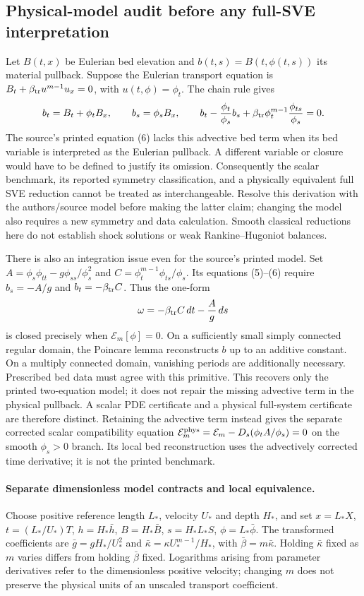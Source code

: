 \documentclass[11pt]{article}
\theoremstyle{definition}
\newcommand{\E}{\mathcal E}
\begin{document}
\subsection{Physical-model audit before any full-SVE interpretation}
Let $B(t,x)$ be Eulerian bed elevation and $b(t,s)=B(t,\phi(t,s))$ its
material pullback. Suppose the Eulerian transport equation is
$B_t+\beta_{\rm tr}u^{m-1}u_x=0$, with $u(t,\phi)=\phi_t$.
The chain rule gives
\begin{equation}
 b_t=B_t+\phi_tB_x,\qquad b_s=\phi_sB_x,
 \qquad
 b_t-\frac{\phi_t}{\phi_s}b_s
       +\beta_{\rm tr}\phi_t^{m-1}\frac{\phi_{ts}}{\phi_s}=0.
 \label{eq:physical-bed-audit}
\end{equation}
The source's printed equation (6) lacks this advective bed term when its bed
variable is interpreted as the Eulerian pullback. A different variable or
closure would have to be defined to justify its omission. Consequently the
scalar benchmark, its reported symmetry classification, and a physically
equivalent full SVE reduction cannot be treated as interchangeable. Resolve
this derivation with the authors/source model before making the latter claim;
changing the model also requires a new symmetry and data calculation.
Smooth classical reductions here do not establish shock solutions or weak
Rankine--Hugoniot balances.

There is also an integration issue even for the source's printed model.
Set $A=\phi_s\phi_{tt}-g\phi_{ss}/\phi_s^2$ and
$C=\phi_t^{m-1}\phi_{ts}/\phi_s$. Its equations (5)--(6) require
$b_s=-A/g$ and $b_t=-\beta_{\rm tr}C$. Thus the one-form
\[
 \omega=-\beta_{\rm tr}C\,dt-\frac{A}{g}\,ds
\]
is closed precisely when $\mathcal E_m[\phi]=0$. On a sufficiently small
simply connected regular domain, the Poincare lemma reconstructs $b$ up to
an additive constant. On a multiply connected domain, vanishing periods
are additionally necessary. Prescribed bed data must agree with this
primitive. This recovers only the printed two-equation model; it does not
repair the missing advective term in the physical pullback. A scalar PDE
certificate and a physical full-system certificate are therefore distinct.
Retaining the advective term instead gives the separate corrected scalar
compatibility equation
$\E_m^{\rm phys}=\E_m-D_s(\phi_tA/\phi_s)=0$
on the smooth $\phi_s>0$ branch. Its local bed reconstruction uses the
advectively corrected time derivative; it is not the printed benchmark.

\paragraph{Separate dimensionless model contracts and local equivalence.}
Choose positive reference length $L_*$, velocity $U_*$ and depth $H_*$,
and set $x=L_*X$, $t=(L_*/U_*)T$, $h=H_*\bar h$,
$B=H_*\bar B$, $s=H_*L_*S$, $\phi=L_*\bar\phi$.
The transformed coefficients are $\bar g=gH_*/U_*^2$ and
$\bar\kappa=\kappa U_*^{m-1}/H_*$, with $\bar\beta=m\bar\kappa$.
Holding $\bar\kappa$ fixed as $m$ varies differs from holding
$\bar\beta$ fixed. Logarithms arising from parameter derivatives refer
to the dimensionless positive velocity; changing $m$ does not preserve
the physical units of an unscaled transport coefficient.
\end{document}
